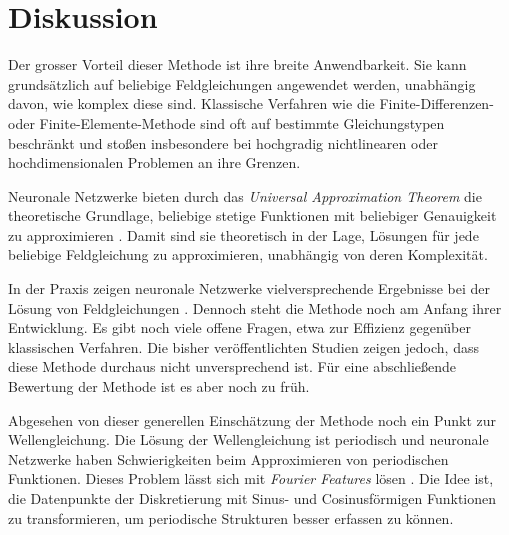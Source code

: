 %
%
%
%

\section{Diskussion\label{neuronal:section:diskussion}}

Der grosser Vorteil dieser Methode ist ihre breite Anwendbarkeit.
Sie kann grundsätzlich auf beliebige Feldgleichungen angewendet werden, unabhängig davon, wie komplex diese sind.
Klassische Verfahren wie die Finite-Differenzen- oder Finite-Elemente-Methode sind oft auf bestimmte Gleichungstypen beschränkt und stoßen insbesondere bei hochgradig nichtlinearen oder hochdimensionalen Problemen an ihre Grenzen.

Neuronale Netzwerke bieten durch das \emph{Universal Approximation Theorem} die theoretische Grundlage, beliebige stetige Funktionen mit beliebiger Genauigkeit zu approximieren \cite{neuronal:universal_approximation_theorem}. 
Damit sind sie theoretisch in der Lage, Lösungen für jede beliebige Feldgleichung zu approximieren, unabhängig von deren Komplexität.

In der Praxis zeigen neuronale Netzwerke vielversprechende Ergebnisse bei der Lösung von Feldgleichungen \cite{neuronal:pinns}. 
Dennoch steht die Methode noch am Anfang ihrer Entwicklung. 
Es gibt noch viele offene Fragen, etwa zur Effizienz gegenüber klassischen Verfahren.
Die bisher veröffentlichten Studien zeigen jedoch, dass diese Methode durchaus nicht unversprechend ist.
Für eine abschließende Bewertung der Methode ist es aber noch zu früh. 

Abgesehen von dieser generellen Einschätzung der Methode noch ein Punkt zur Wellengleichung.
Die Lösung der Wellengleichung ist periodisch und neuronale Netzwerke haben Schwierigkeiten beim Approximieren von periodischen Funktionen.
Dieses Problem lässt sich mit \emph{Fourier Features} lösen \cite{neuronal:fourier_features}.
Die Idee ist, die Datenpunkte der Diskretierung mit Sinus- und Cosinusförmigen Funktionen zu transformieren, um periodische Strukturen besser erfassen zu können.
